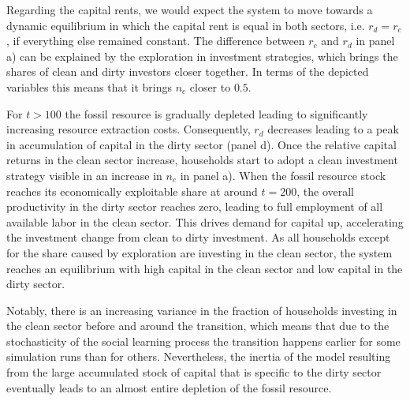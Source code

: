 Regarding the capital rents, we would expect the system to move towards a dynamic equilibrium in which the capital rent is equal in both sectors, i.e. $r_d = r_c$, if everything else remained constant.
The difference between $r_c$ and $r_d$ in panel a) can be explained by the exploration in investment strategies, which brings the shares of clean and dirty investors closer together. In terms of the depicted variables this means that it brings $n_c$ closer to $0.5$. 

For $t>100$ the fossil resource is gradually depleted leading to significantly increasing resource extraction costs. Consequently, $r_d$ decreases leading to a peak in accumulation of capital in the dirty sector (panel d).
Once the relative capital returns in the clean sector increase, households start to adopt a clean investment strategy visible in an increase in $n_c$ in panel a).
When the fossil resource stock reaches its economically exploitable share at around $t=200$, the overall productivity in the dirty sector reaches zero, leading to full employment of all available labor in the clean sector.
This drives demand for capital up, accelerating the investment change from clean to dirty investment.
As all households except for the share caused by exploration are investing in the clean sector, the system reaches an equilibrium with high capital in the clean sector and low capital in the dirty sector.

Notably, there is an increasing variance in the fraction of households investing in the clean sector before and around the transition, which means that due to the stochasticity of the social learning process the transition happens earlier for some simulation runs than for others. Nevertheless, the inertia of the model resulting from the large accumulated stock of capital that is specific to the dirty sector eventually leads to an almost entire depletion of the fossil resource.


